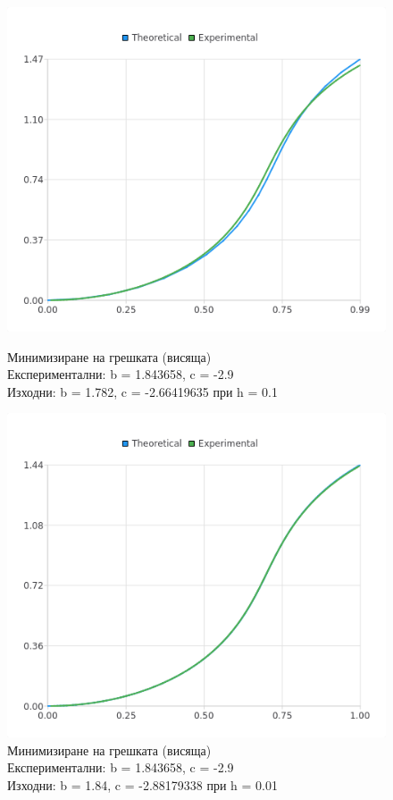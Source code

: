 \documentclass{article}
\begin{document}
\begin{figure}[H]
\centering
\begin{minipage}{0.5\textwidth}
  \centering
  \includegraphics[width=1\linewidth]{gradient-descent-1-0.1.png}
  \caption{Минимизиране на грешката (висяща) \protect\\ Експериментални: b = 1.843658, c = -2.9 \protect\\ Изходни: b = 1.782, c = -2.66419635 при h = 0.1}
\end{minipage}%
\begin{minipage}{0.5\textwidth}
  \centering
  \includegraphics[width=1\linewidth]{gradient-descent-1-0.01.png}
  \caption{Минимизиране на грешката (висяща) \protect\\ Експериментални: b = 1.843658, c = -2.9 \protect\\ Изходни: b = 1.84, c = -2.88179338 при h = 0.01}
\end{minipage}
\end{figure}
\end{document}
